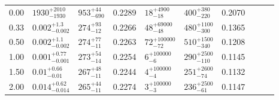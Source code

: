 \begin{tabular}{@{}rllr llr llr@{}}
\cmidrule(lr){1-7}
0.00 & ${1930}^{+2010}_{-1930}$ & ${953}^{+44}_{-690}$ & 0.2289
     & ${18}^{+4900}_{-18}$ & ${400}^{+380}_{-220}$ & 0.2070\\
0.33 & ${0.002}^{+1.3}_{-0.002}$ & ${274}^{+93}_{-12}$ & 0.2266
     & ${48}^{+69000}_{-48}$ & ${480}^{+1100}_{-300}$ & 0.1365\\
0.50 & ${0.002}^{+1.1}_{-0.002}$ & ${274}^{+77}_{-11}$ & 0.2263
     & ${72}^{+100000}_{-72}$ & ${510}^{+1500}_{-340}$ & 0.1208\\
1.00 & ${0.001}^{+0.77}_{-0.001}$ & ${273}^{+54}_{-14}$ & 0.2254
     & ${6}^{+100000}_{-6}$ & ${290}^{+2500}_{-110}$ & 0.1145\\
1.50 & ${0.01}^{+0.66}_{-0.01}$ & ${267}^{+48}_{-11}$ & 0.2244
     & ${4}^{+100000}_{-4}$ & ${251}^{+2600}_{-74}$ & 0.1132\\
2.00 & ${0.014}^{+0.62}_{-0.014}$ & ${265}^{+44}_{-11}$ & 0.2274
     & ${3}^{+100000}_{-3}$ & ${236}^{+2500}_{-61}$ & 0.1147\\

\bottomrule
\end{tabular} 
